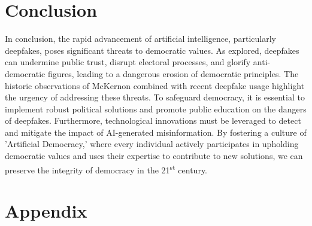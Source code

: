\documentclass[wide]{adonis}
\begin{document}
       \section{Conclusion}
    In conclusion, the rapid advancement of artificial intelligence, particularly deepfakes, poses significant threats to democratic values. As explored, deepfakes can undermine public trust, disrupt electoral processes, and glorify anti-democratic figures, leading to a dangerous erosion of democratic principles. The historic observations of McKernon combined with recent deepfake usage highlight the urgency of addressing these threats. To safeguard democracy, it is essential to implement robust political solutions and promote public education on the dangers of deepfakes. Furthermore, technological innovations must be leveraged to detect and mitigate the impact of AI-generated misinformation. By fostering a culture of 'Artificial Democracy,' where every individual actively participates in upholding democratic values and uses their expertise to contribute to new solutions, we can preserve the integrity of democracy in the 21\textsuperscript{st} century.

       
        

            
        \clearpage
        
        
        
        \clearpage
        \appendix
        \section{Appendix}
\end{document}
